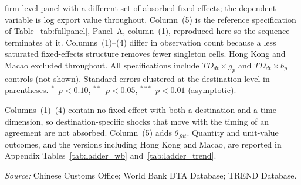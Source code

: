 \begin{table}[htbp]
\begin{threeparttable}
\begin{tablenotes}[flushleft]
  firm-level panel with a different set of absorbed fixed effects; the dependent variable is log export
  value throughout. Column~(5) is the reference specification of Table~\ref{tab:fullpanel}, Panel~A,
  column~(1), reproduced here so the sequence terminates at it. Columns~(1)--(4) differ in observation
  count because a less saturated fixed-effects structure removes fewer singleton cells. Hong Kong and
  Macao excluded throughout. All specifications include $TD_{dt} \times g_p$ and $TD_{dt} \times b_p$
  controls (not shown). Standard errors clustered at the destination level in parentheses.
  $^{*}$~$p<0.10$, $^{**}$~$p<0.05$, $^{***}$~$p<0.01$ (asymptotic).
\item Columns~(1)--(4) contain no fixed effect with both a destination and a time dimension, so
  destination-specific shocks that move with the timing of an agreement are not absorbed. Column~(5)
  adds $\theta_{fdt}$. Quantity and unit-value outcomes, and the versions including Hong Kong and Macao,
  are reported in Appendix Tables~\ref{tab:ladder_wb} and~\ref{tab:ladder_trend}.
\item \textit{Source:} Chinese Customs Office; World Bank DTA Database; TREND Database.
\end{tablenotes}
\end{threeparttable}
\end{table}
